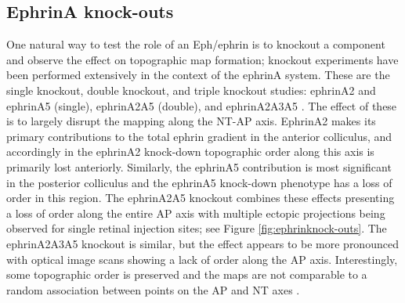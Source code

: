 \subsection{EphrinA knock-outs}
One natural way to test the role of an Eph/ephrin is to knockout a component and observe the effect on topographic map formation; knockout experiments have been performed extensively in the context of the ephrinA system. These are the single knockout, double knockout, and triple knockout studies: ephrinA2 and ephrinA5 (single), ephrinA2A5 (double), and ephrinA2A3A5 \cite{Frisen1998-jw, Feldheim2000-ec, Cang2008-ez}. The effect of these is to largely disrupt the mapping along the NT-AP axis. EphrinA2 makes its primary contributions to the total ephrin gradient in the anterior colliculus, and accordingly in the ephrinA2 knock-down topographic order along this axis is primarily lost anteriorly. Similarly, the ephrinA5 contribution is most significant in the posterior colliculus and the ephrinA5 knock-down phenotype has a loss of order in this region. The ephrinA2A5 knockout combines these effects presenting a loss of order along the entire AP axis with multiple ectopic projections being observed for single retinal injection sites; see Figure \ref{fig:ephrinknock-outs}. The ephrinA2A3A5 knockout is similar, but the effect appears to be more pronounced with optical image scans showing a lack of order along the AP axis. Interestingly, some topographic order is preserved and the maps are not comparable to a random association between points on the AP and NT axes \cite{Willshaw2014-ms}. 


\FloatBarrier
